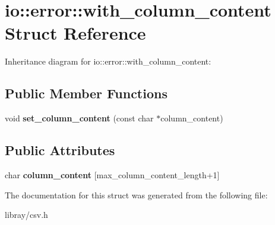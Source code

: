 \hypertarget{structio_1_1error_1_1with__column__content}{}\section{io\+:\+:error\+:\+:with\+\_\+column\+\_\+content Struct Reference}
\label{structio_1_1error_1_1with__column__content}


Inheritance diagram for io\+:\+:error\+:\+:with\+\_\+column\+\_\+content\+:
\subsection*{Public Member Functions}
\begin{DoxyCompactItemize}
\item 
\mbox{\label{structio_1_1error_1_1with__column__content_ae7375310dc02425cb3cc4115b3ac8d6a}} 
void {\bfseries set\+\_\+column\+\_\+content} (const char $\ast$column\+\_\+content)
\end{DoxyCompactItemize}
\subsection*{Public Attributes}
\begin{DoxyCompactItemize}
\item 
\mbox{\label{structio_1_1error_1_1with__column__content_a8587779769fbfb40155abb362137a523}} 
char {\bfseries column\+\_\+content} \mbox{[}max\+\_\+column\+\_\+content\+\_\+length+1\mbox{]}
\end{DoxyCompactItemize}


The documentation for this struct was generated from the following file\+:\begin{DoxyCompactItemize}
\item 
libray/csv.\+h\end{DoxyCompactItemize}
